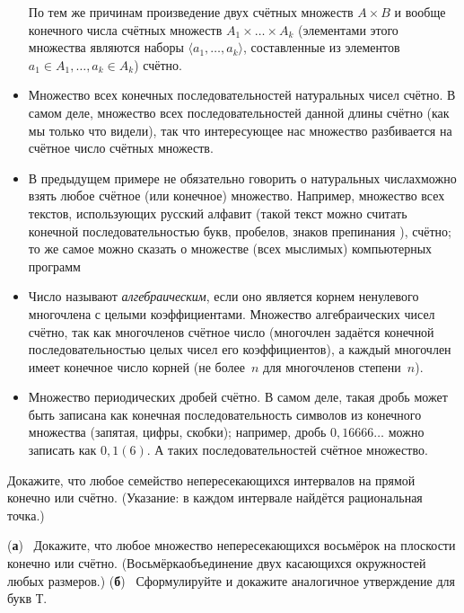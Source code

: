 \begin{itemize}
По тем же причинам произведение двух счётных множеств $A\times
B$ и вообще конечного числа счётных множеств
$A_1\times\ldots\times A_k$ (элементами этого множества являются
наборы $\langle a_1,\ldots,a_k\rangle$, составленные из
элементов $a_1\in A_1,\ldots,a_k\in A_k$) счётно.
\item
Множество всех конечных последовательностей натуральных чисел
счётно. В самом деле, множество всех последовательностей
данной длины счётно (как мы только что видели), так что
интересующее нас множество разбивается на счётное число
счётных множеств.
\item
В предыдущем примере не обязательно говорить о натуральных числах\т можно
взять любое счётное (или конечное) множество. Например, множество
всех текстов, использующих русский алфавит (такой текст можно считать
конечной последовательностью букв, пробелов, знаков препинания ),
счётно; то же самое можно сказать о множестве (всех мыслимых)
компьютерных программ 
\item
Число называют \emph{алгебраическим}, если оно является корнем
ненулевого многочлена с целыми коэффициентами. Множество
алгебраических чисел счётно, так как многочленов счётное число
(многочлен задаётся конечной последовательностью целых чисел\т
его коэффициентов), а каждый многочлен имеет конечное число
корней (не более~$n$ для многочленов степени~$n$).
\item
Множество периодических дробей счётно.
В самом деле, такая дробь
может быть записана как конечная последовательность символов из
конечного множества (запятая, цифры, скобки); например,
дробь $0{,}16666{\dots}$ можно записать как
$0{,}1(6)$. А таких последовательностей счётное множество.
\end{itemize}

\begin{problem}
Докажите, что любое семейство непересекающихся интервалов
на прямой конечно или счётно. (Указание: в каждом интервале
найдётся рациональная точка.)
\end{problem}

\begin{problem}
(\textbf{а})~%
Докажите, что любое множество непересекающихся восьмёрок на
плоскости конечно или счётно. (Восьмёрка\т объединение двух
касающихся окружностей любых размеров.)
(\textbf{б})~%
Сформулируйте и докажите аналогичное утверждение для букв
\textsf{Т}.
\end{problem}

